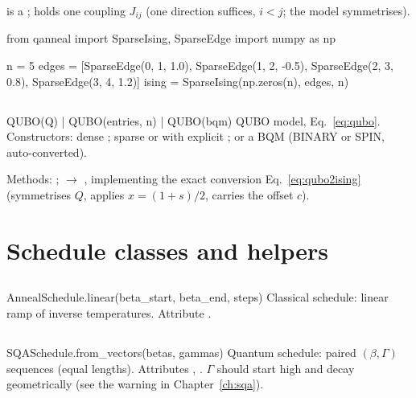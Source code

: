  is a ; 
holds one coupling $J_{ij}$ (one direction suffices, $i<j$; the model
symmetrises).

\begin{pycode}
from qanneal import SparseIsing, SparseEdge
import numpy as np

n = 5
edges = [SparseEdge(0, 1, 1.0), SparseEdge(1, 2, -0.5),
         SparseEdge(2, 3, 0.8), SparseEdge(3, 4, 1.2)]
ising = SparseIsing(np.zeros(n), edges, n)
\end{pycode}

\subsection{}

\begin{apibox}{QUBO(Q) \;|\; QUBO(entries, n) \;|\; QUBO(bqm)}
QUBO model, Eq.~\eqref{eq:qubo}. Constructors: dense
; sparse  or
 with explicit ; or a 
BQM (BINARY or SPIN, auto-converted).
\end{apibox}

Methods: ;  $\to$ ,
implementing the exact conversion Eq.~\eqref{eq:qubo2ising} (symmetrises
$Q$, applies $x=(1+s)/2$, carries the offset $c$).

\section{Schedule classes and helpers}
\label{sec:api-schedules}

\subsection{}

\begin{apibox}{AnnealSchedule.linear(beta\_start, beta\_end, steps)}
Classical schedule: linear ramp of inverse temperatures. Attribute
.
\end{apibox}

\subsection{}

\begin{apibox}{SQASchedule.from\_vectors(betas, gammas)}
Quantum schedule: paired $(\beta,\Gamma)$ sequences (equal lengths).
Attributes , . $\Gamma$ should start high and
decay geometrically (see the warning in Chapter~\ref{ch:sqa}).
\end{apibox}

